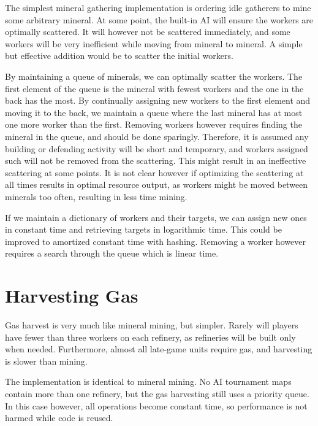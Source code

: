 The simplest mineral gathering implementation is ordering idle gatherers to mine some arbitrary mineral. At some point, the built-in AI will ensure the workers are optimally scattered. It will however not be scattered immediately, and some workers will be very inefficient while moving from mineral to mineral. A simple but effective addition would be to scatter the initial workers.

By maintaining a queue of minerals, we can optimally scatter the workers. The first element of the queue is the mineral with fewest workers and the one in the back has the most. By continually assigning new workers to the first element and moving it to the back, we maintain a queue where the last mineral has at most one more worker than the first. Removing workers however requires finding the mineral in the queue, and should be done sparingly. Therefore, it is assumed any building or defending activity will be short and temporary, and workers assigned such will not be removed from the scattering. This might result in an ineffective scattering at some points. It is not clear however if optimizing the scattering at all times results in optimal resource output, as workers might be moved between minerals too often, resulting in less time mining.

If we maintain a dictionary of workers and their targets, we can assign new ones in constant time and retrieving targets in logarithmic time. This could be improved to amortized constant time with hashing. Removing a worker however requires a search through the queue which is linear time.


\section{Harvesting Gas}	
Gas harvest is very much like mineral mining, but simpler. Rarely will players have fewer than three workers on each refinery, as refineries will be built only when needed. Furthermore, almost all late-game units require gas, and harvesting is slower than mining.

The implementation is identical to mineral mining. No AI tournament maps contain more than one refinery, but the gas harvesting still uses a priority queue. In this case however, all operations become constant time, so performance is not harmed while code is reused.